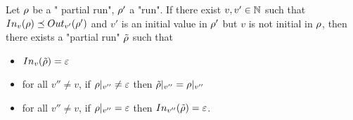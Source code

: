 \begin{lemma}
	\label{lem:boss-composition}
	Let $\rho$ be a " partial run", $\rho'$ a "run".
	If there exist $v, v' \in \mathbb{N}$ such that $\vinput{v}{\run} \subword \voutput{v'}{\run'}$ and $v'$ is an initial value in $\rho'$ but $v$ is not initial in $\rho$, then there exists a "partial run" $\Tilde{\rho}$ such that 
	\begin{itemize}
		\item $\vinput{v}{\Tilde{\run}} = \varepsilon$ 
		
		\item for all $v'' \neq v$, if ${\rho}|_{v''} \neq \varepsilon$ then ${\Tilde{\rho}}|_{v''} = {\rho}|_{v''}$
		
		\item for all $v'' \neq v$, if ${\rho}|_{v''} = \varepsilon$ then $\vinput{v''}{\Tilde{\run}} = \varepsilon$.
	\end{itemize}
\end{lemma}

